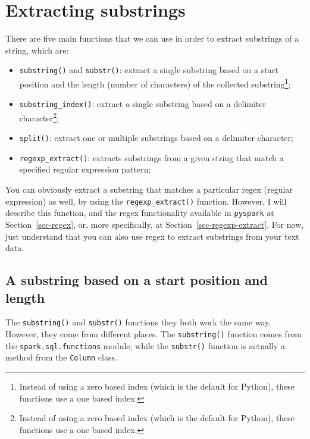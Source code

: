 \documentclass[
  11pt,
  letterpaper,
  DIV=11,
  numbers=noendperiod]{scrreprt}
\providecommand{\tightlist}{%
  \setlength{\itemsep}{0pt}\setlength{\parskip}{0pt}}\usepackage{longtable,booktabs,array}
\begin{document}
\hypertarget{extracting-substrings}{%
\section{Extracting substrings}\label{extracting-substrings}}

There are five main functions that we can use in order to extract
substrings of a string, which are:

\begin{itemize}
\tightlist
\item
  \texttt{substring()} and \texttt{substr()}: extract a single substring
  based on a start position and the length (number of characters) of the
  collected substring\footnote{Instead of using a zero based index
    (which is the default for Python), these functions use a one based
    index.};
\item
  \texttt{substring\_index()}: extract a single substring based on a
  delimiter character\footnote{Instead of using a zero based index
    (which is the default for Python), these functions use a one based
    index.};
\item
  \texttt{split()}: extract one or multiple substrings based on a
  delimiter character;
\item
  \texttt{regexp\_extract()}: extracts substrings from a given string
  that match a specified regular expression pattern;
\end{itemize}

You can obviously extract a substring that matches a particular regex
(regular expression) as well, by using the \texttt{regexp\_extract()}
function. However, I will describe this function, and the regex
functionality available in \texttt{pyspark} at Section~\ref{sec-regex},
or, more specifically, at Section~\ref{sec-regexp-extract}. For now,
just understand that you can also use regex to extract substrings from
your text data.

\hypertarget{a-substring-based-on-a-start-position-and-length}{%
\subsection{A substring based on a start position and
length}\label{a-substring-based-on-a-start-position-and-length}}

The \texttt{substring()} and \texttt{substr()} functions they both work
the same way. However, they come from different places. The
\texttt{substring()} function comes from the
\texttt{spark.sql.functions} module, while the \texttt{substr()}
function is actually a method from the \texttt{Column} class.
\end{document}

